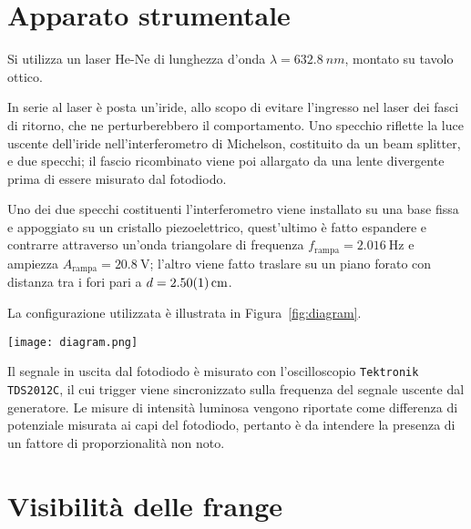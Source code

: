 \documentclass[10pt,oneside,a4paper]{article}
\newenvironment{Figure}
  {\par\medskip\noindent\minipage{\linewidth}}
  {\endminipage\par\medskip}
\begin{document}
\begin{multicols}{2}
\section{Apparato strumentale}

Si utilizza un laser He-Ne di lunghezza d'onda $\lambda = \SI{632.8}{nm}$, montato su tavolo ottico. 

In serie al laser è posta un'iride, allo scopo di evitare l'ingresso nel laser dei fasci di ritorno, che ne perturberebbero il comportamento. Uno specchio riflette la luce uscente dell'iride nell'interferometro di Michelson, costituito da un beam splitter, e due specchi; il fascio ricombinato viene poi allargato da una lente divergente prima di essere misurato dal fotodiodo.

Uno dei due specchi costituenti l'interferometro viene installato su una base fissa e appoggiato su un cristallo piezoelettrico, quest'ultimo è fatto espandere e contrarre attraverso un'onda triangolare di frequenza $f_\mathrm{rampa} = \SI{2.016}{\hertz}$ e ampiezza $A_\mathrm{rampa} = \SI{20.8}{\volt}$; l'altro viene fatto traslare su un piano forato con distanza tra i fori pari a $d = \SI{2.50 \pm 0.01}{cm}$. 

La configurazione utilizzata è illustrata in Figura~\ref{fig:diagram}.

\begin{Figure}
	\begin{center}
	\texttt{[image: diagram.png]}
	\label{fig:diagram}
	\end{center}
\end{Figure}

Il segnale in uscita dal fotodiodo è misurato con l'oscilloscopio \texttt{Tektronik TDS2012C}, il cui trigger viene sincronizzato sulla frequenza del segnale uscente dal generatore. Le misure di intensità luminosa vengono riportate come differenza di potenziale misurata ai capi del fotodiodo, pertanto è da intendere la presenza di un fattore di proporzionalità non noto.

\section{Visibilità delle frange}

\end{multicols}
\end{document}
